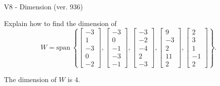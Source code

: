 \begin{exercise}
  \begin{exerciseTitle}V8 - Dimension (ver. 936)\end{exerciseTitle}
  \begin{exerciseStatement}
    Explain how to find the dimension of 
\[W=\mathrm{span}\ \left\{\left[\begin{array}{r}
-3 \\
1 \\
-3 \\
0 \\
-2
\end{array}\right] , \left[\begin{array}{r}
-3 \\
0 \\
-1 \\
-3 \\
-1
\end{array}\right] , \left[\begin{array}{r}
-3 \\
-2 \\
-4 \\
2 \\
-3
\end{array}\right] , \left[\begin{array}{r}
9 \\
-3 \\
2 \\
11 \\
2
\end{array}\right] , \left[\begin{array}{r}
2 \\
3 \\
1 \\
-1 \\
2
\end{array}\right]\right\}.\]



  \end{exerciseStatement}
  \begin{exerciseAnswer}
   The dimension of \(W\) is  \(4\).
  


  \end{exerciseAnswer}
\end{exercise}